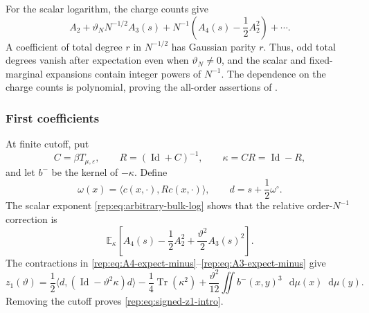 \documentclass[11pt,reqno]{amsart}
\numberwithin{equation}{section}
\theoremstyle{plain}
\theoremstyle{definition}
\newcommand{\dd}{\mathop{}\!\mathrm d}
\newcommand{\E}{\mathbb E}
\newcommand{\Id}{\operatorname{Id}}
\newcommand{\Tr}{\operatorname{Tr}}
\newcommand{\be}{\beta}
\newcommand{\vep}{\varepsilon}
\begin{document}
For the scalar logarithm, the charge counts give
\begin{equation}\label{rep:eq:arbitrary-bulk-log}
 A_2+\vartheta_NN^{-1/2}A_3(s)
 +N^{-1}\left(A_4(s)-\frac12A_2^2\right)+\cdots.
\end{equation}
A coefficient of total degree $r$ in $N^{-1/2}$ has Gaussian parity $r$.  Thus, odd total degrees vanish after expectation even when $\vartheta_N\ne0$, and the scalar and fixed-marginal expansions contain integer powers of $N^{-1}$.  The dependence on the charge counts is polynomial, proving the all-order assertions of .

\subsubsection{First coefficients}

At finite cutoff, put
\begin{equation}\label{rep:eq:finite-arbitrary-operators}
 C=\be T_{\mu,\vep},\qquad
 R=(\Id+C)^{-1},\qquad
 \kappa=CR=\Id-R,
\end{equation}
and let $b^-$ be the kernel of $-\kappa$.  Define
\begin{equation}\label{rep:eq:finite-arbitrary-d}
 \omega(x)=\langle c(x,\cdot),Rc(x,\cdot)\rangle,
 \qquad
 d=s+\frac12\omega^\circ.
\end{equation}
The scalar exponent \eqref{rep:eq:arbitrary-bulk-log} shows that the relative order-$N^{-1}$ correction is
\begin{equation}\label{rep:eq:arbitrary-z1-start}
 \E_\kappa\left[A_4(s)-\frac12A_2^2
 +\frac{\vartheta^2}{2}A_3(s)^2\right].
\end{equation}
The contractions in \eqref{rep:eq:A4-expect-minus}--\eqref{rep:eq:A3-expect-minus} give
\begin{equation}\label{rep:eq:arbitrary-z1-finite}
 z_1(\vartheta)
 =\frac12\langle d,(\Id-\vartheta^2\kappa)d\rangle
 -\frac14\Tr(\kappa^2)
 +\frac{\vartheta^2}{12}\iint b^-(x,y)^3\,\dd\mu(x)\dd\mu(y).
\end{equation}
Removing the cutoff proves \eqref{rep:eq:signed-z1-intro}.
\end{document}
